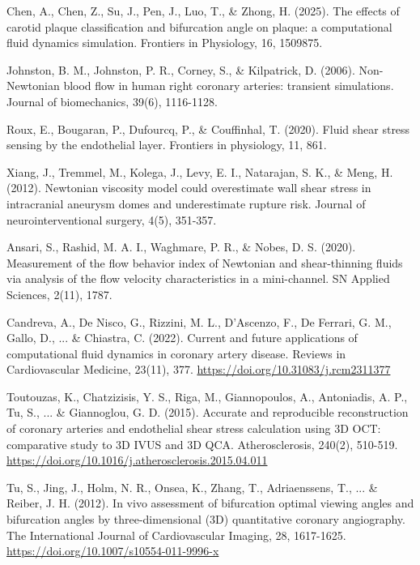 ﻿\documentclass[12pt,a4paper]{article}
\theoremstyle{definition}
\numberwithin{equation}{section}
\begin{document}
\begin{thebibliography}{}
 Chen, A., Chen, Z., Su, J., Pen, J., Luo, T., \& Zhong, H. (2025). The effects of carotid plaque classification and bifurcation angle on plaque: a computational fluid dynamics simulation. Frontiers in Physiology, 16, 1509875.

   Johnston, B. M., Johnston, P. R., Corney, S., \& Kilpatrick, D. (2006). Non-Newtonian blood flow in human right coronary arteries: transient simulations. Journal of biomechanics, 39(6), 1116-1128.

 Roux, E., Bougaran, P., Dufourcq, P., \& Couffinhal, T. (2020). Fluid shear stress sensing by the endothelial layer. Frontiers in physiology, 11, 861.

  Xiang, J., Tremmel, M., Kolega, J., Levy, E. I., Natarajan, S. K., \& Meng, H. (2012). Newtonian viscosity model could overestimate wall shear stress in intracranial aneurysm domes and underestimate rupture risk. Journal of neurointerventional surgery, 4(5), 351-357.

 Ansari, S., Rashid, M. A. I., Waghmare, P. R., \& Nobes, D. S. (2020). Measurement of the flow behavior index of Newtonian and shear-thinning fluids via analysis of the flow velocity characteristics in a mini-channel. SN Applied Sciences, 2(11), 1787.

 Candreva, A., De Nisco, G., Rizzini, M. L., D’Ascenzo, F., De Ferrari, G. M., Gallo, D., ... \& Chiastra, C. (2022). Current and future applications of computational fluid dynamics in coronary artery disease. Reviews in Cardiovascular Medicine, 23(11), 377. \url{https://doi.org/10.31083/j.rcm2311377}

 Toutouzas, K., Chatzizisis, Y. S., Riga, M., Giannopoulos, A., Antoniadis, A. P., Tu, S., ... \& Giannoglou, G. D. (2015). Accurate and reproducible reconstruction of coronary arteries and endothelial shear stress calculation using 3D OCT: comparative study to 3D IVUS and 3D QCA. Atherosclerosis, 240(2), 510-519. \url{https://doi.org/10.1016/j.atherosclerosis.2015.04.011}

 Tu, S., Jing, J., Holm, N. R., Onsea, K., Zhang, T., Adriaenssens, T., ... \& Reiber, J. H. (2012). In vivo assessment of bifurcation optimal viewing angles and bifurcation angles by three-dimensional (3D) quantitative coronary angiography. The International Journal of Cardiovascular Imaging, 28, 1617-1625. \url{https://doi.org/10.1007/s10554-011-9996-x} 


\end{thebibliography}
\end{document}

